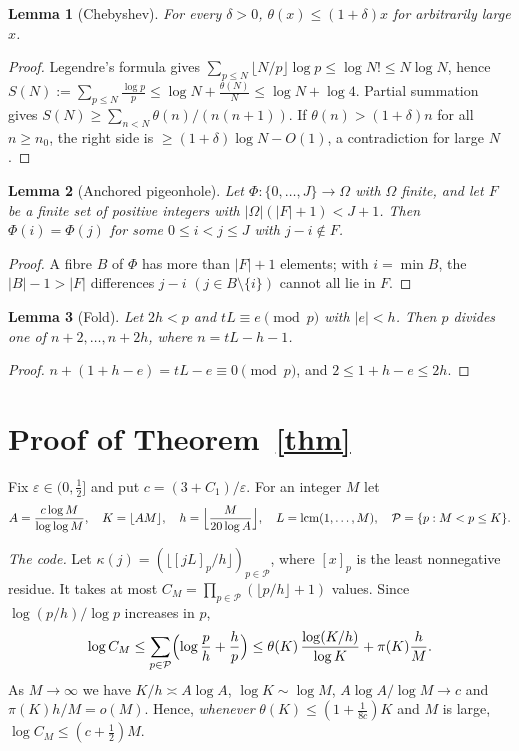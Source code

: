 \documentclass[11pt]{article}
\newtheorem{lemma}{Lemma}
\theoremstyle{remark}
\DeclareMathOperator{\lcm}{lcm}
\begin{document}
\begin{lemma}[Chebyshev]\label{lem:cheb}
For every \(\delta>0\), \(\theta(x)\le(1+\delta)x\) for arbitrarily large \(x\).
\end{lemma}

\begin{proof}
Legendre's formula gives \(\sum_{p\le N}\lfloor N/p\rfloor\log p\le\log N!\le N\log N\), hence
\(S(N):=\sum_{p\le N}\frac{\log p}{p}\le\log N+\frac{\theta(N)}N\le\log N+\log4\).
Partial summation gives \(S(N)\ge\sum_{n<N}\theta(n)/(n(n+1))\).  If \(\theta(n)>(1+\delta)n\)
for all \(n\ge n_0\), the right side is \(\ge(1+\delta)\log N-O(1)\), a contradiction for large
\(N\).
\end{proof}

\begin{lemma}[Anchored pigeonhole]\label{lem:anchor}
Let \(\Phi:\{0,\dots,J\}\to\Omega\) with \(\Omega\) finite, and let \(F\) be a finite set of
positive integers with \(|\Omega|(|F|+1)<J+1\).  Then \(\Phi(i)=\Phi(j)\) for some
\(0\le i<j\le J\) with \(j-i\notin F\).
\end{lemma}

\begin{proof}
A fibre \(B\) of \(\Phi\) has more than \(|F|+1\) elements; with \(i=\min B\), the \(|B|-1>|F|\)
differences \(j-i\) \((j\in B\setminus\{i\})\) cannot all lie in \(F\).
\end{proof}

\begin{lemma}[Fold]\label{lem:fold}
Let \(2h<p\) and \(tL\equiv e\pmod p\) with \(|e|<h\).  Then \(p\) divides one of
\(n+2,\dots,n+2h\), where \(n=tL-h-1\).
\end{lemma}

\begin{proof}
\(n+(1+h-e)=tL-e\equiv0\pmod p\), and \(2\le1+h-e\le2h\).
\end{proof}

\section{Proof of Theorem~\ref{thm}}

Fix \(\varepsilon\in(0,\frac12]\) and put \(c=(3+C_1)/\varepsilon\).  For an integer \(M\) let
\[
A=\frac{c\log M}{\log\log M},\quad K=\lfloor AM\rfloor,\quad
h=\Bigl\lfloor\frac{M}{20\log A}\Bigr\rfloor,\quad L=\lcm(1,\dots,M),\quad
\mathcal P=\{p:M<p\le K\}.
\]

\emph{The code.}  Let \(\kappa(j)=(\lfloor[jL]_p/h\rfloor)_{p\in\mathcal P}\), where \([x]_p\)
is the least nonnegative residue.  It takes at most
\(C_M=\prod_{p\in\mathcal P}(\lfloor p/h\rfloor+1)\) values.  Since \(\log(p/h)/\log p\) increases
in \(p\),
\[
\log C_M\le\sum_{p\in\mathcal P}\Bigl(\log\frac ph+\frac hp\Bigr)
\le\theta(K)\,\frac{\log(K/h)}{\log K}+\pi(K)\frac hM .
\]
As \(M\to\infty\) we have \(K/h\asymp A\log A\), \(\log K\sim\log M\),
\(A\log A/\log M\to c\) and \(\pi(K)h/M=o(M)\).  Hence, \emph{whenever}
\(\theta(K)\le(1+\frac1{8c})K\) and \(M\) is large, \(\log C_M\le(c+\frac12)M\).
\end{document}
